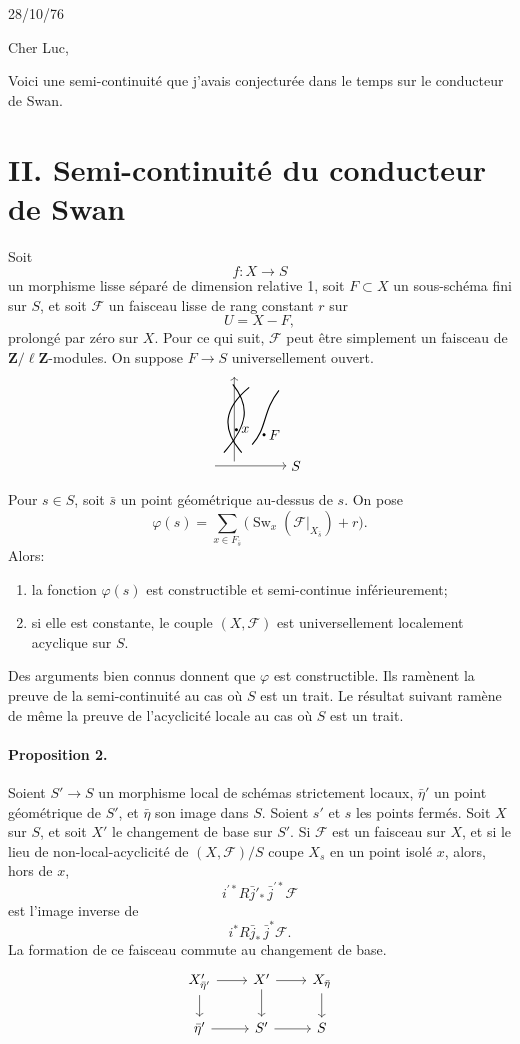 \documentclass[11pt]{article}
\newcommand{\semistableSketch}{%
\begin{tikzpicture}[scale=.75,baseline=-.5ex]
  \draw[->] (-.2,0) -- (2.2,0) node[right]{$S$};
  \draw[->] (.45,.15) -- (.45,3.0);
  \draw[thick] (.1,.45) .. controls (.9,1.35) and (1.0,2.0) .. (.4,2.75);
  \draw[thick] (.7,.45) .. controls (.0,1.25) and (.1,1.95) .. (.95,2.65);
  \draw[thick] (1.05,.72) .. controls (1.55,1.25) and (1.4,1.85) .. (1.95,2.55);
  \fill (.52,1.22) circle (1.5pt) node[right]{$x$};
  \fill (1.45,1.05) circle (1.5pt) node[right]{$F$};
\end{tikzpicture}%
}
\newcommand{\F}{\mathcal F}
\newcommand{\Zell}{\mathbf Z/\ell\mathbf Z}
\DeclareMathOperator{\Sw}{Sw}
\begin{document}
\begin{flushright}
28/10/76
\end{flushright}

Cher Luc,

Voici une semi-continuité que j'avais conjecturée dans le temps sur le conducteur de Swan.

\section*{II. Semi-continuité du conducteur de Swan}

Soit
\[
  f:X\longrightarrow S
\]
un morphisme lisse séparé de dimension relative 1, soit \(F\subset X\) un sous-schéma fini sur \(S\), et soit \(\F\) un faisceau lisse de rang constant \(r\) sur
\[
  U=X-F,
\]
prolongé par zéro sur \(X\). Pour ce qui suit, \(\F\) peut être simplement un faisceau de \(\Zell\)-modules. On suppose \(F\to S\) universellement ouvert.
\[
\semistableSketch
\]

Pour \(s\in S\), soit \(\bar s\) un point géométrique au-dessus de \(s\). On pose
\[
  \varphi(s)=\sum_{x\in F_{\bar s}}
  \bigl(\Sw_x(\F|_{X_{\bar s}})+r\bigr).
\]
Alors:
\begin{enumerate}[label=(\roman*)]
\item la fonction \(\varphi(s)\) est constructible et semi-continue inférieurement;
\item si elle est constante, le couple \((X,\F)\) est universellement localement acyclique sur \(S\).
\end{enumerate}

Des arguments bien connus donnent que \(\varphi\) est constructible. Ils ramènent la preuve de la semi-continuité au cas où \(S\) est un trait. Le résultat suivant ramène de même la preuve de l'acyclicité locale au cas où \(S\) est un trait.

\paragraph{Proposition 2.}
Soient \(S'\to S\) un morphisme local de schémas strictement locaux, \(\bar\eta'\) un point géométrique de \(S'\), et \(\bar\eta\) son image dans \(S\). Soient \(s'\) et \(s\) les points fermés. Soit \(X\) sur \(S\), et soit \(X'\) le changement de base sur \(S'\). Si \(\F\) est un faisceau sur \(X\), et si le lieu de non-local-acyclicité de \((X,\F)/S\) coupe \(X_s\) en un point isolé \(x\), alors, hors de \(x\),
\[
  i^{\prime *} R\bar j'_{*}\,\bar j^{\prime *}\F
\]
est l'image inverse de
\[
  i^{*}R\bar j_{*}\,\bar j^{*}\F.
\]
La formation de ce faisceau commute au changement de base.
\[
\begin{tikzcd}[column sep=2.2em,row sep=1.6em]
X'_{\bar\eta'} \arrow[r] \arrow[d] & X' \arrow[r] \arrow[d] & X_{\bar\eta} \arrow[d] \\
\bar\eta' \arrow[r] & S' \arrow[r] & S
\end{tikzcd}
\]
\end{document}
